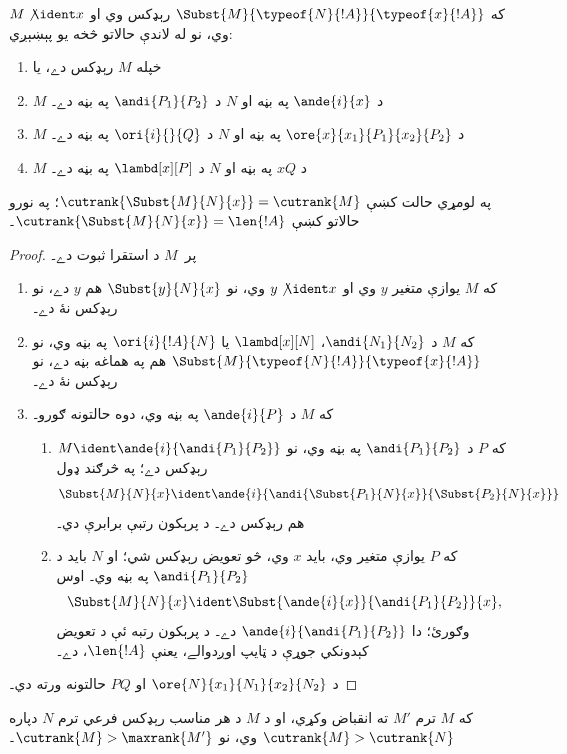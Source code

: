 \documentclass[../../../include/open-logic-section]{subfiles}
\begin{document}
\begin{lem}
  که $\Subst{M}{\typeof{N}{!A}}{\typeof{x}{!A}}$ رېډکس وي او
  $M \not\ident x$ وي، نو له لاندې حالاتو څخه يو پېښېږي:
  \begin{enumerate}
  \item خپله $M$ رېډکس دے، يا
  \item $M$ د $\ande{i}{x}$ په بڼه او $N$ د
    $\andi{P_1}{P_2}$ په بڼه دے۔
  \item $M$ د $\ore{x}{x_1}{P_1}{x_2}{P_2}$ په بڼه او $N$
    د $\ori{i}{}{Q}$ په بڼه دے۔
  \item $M$ د $x Q$ په بڼه او $N$ د
    $\lambd[x][P]$ په بڼه دے۔
  \end{enumerate}
  په لومړي حالت کښې $\cutrank{\Subst{M}{N}{x}} = \cutrank{M}$؛
  په نورو حالاتو کښې $\cutrank{\Subst{M}{N}{x}} = \len{!A}$۔
\end{lem}
\begin{proof}
  پر~$M$ د استقرا ثبوت دے۔
  \begin{enumerate}
  \item که $M$ يوازې متغير $y$ وي او $y \not\ident x$ وي، نو
    $\Subst{y}{N}{x}$ هم $y$ دے، نو رېډکس نۀ دے۔
  \item که $M$ د $\andi{N_1}{N_2}$، $\lambd[x][N]$ يا
    $\ori{i}{!A}{N}$ په بڼه وي، نو
    $\Subst{M}{\typeof{N}{!A}}{\typeof{x}{!A}}$ هم په هماغه
    بڼه دے، نو رېډکس نۀ دے۔
  \item که $M$ د $\ande{i}{P}$ په بڼه وي، دوه حالتونه ګورو۔
    \begin{enumerate}
      \item که $P$ د $\andi{P_1}{P_2}$ په بڼه وي، نو
        $M \ident \ande{i}{\andi{P_1}{P_2}}$ رېډکس دے؛ په
        څرګند ډول
        \[
        \Subst{M}{N}{x} \ident
        \ande{i}{\andi{\Subst{P_1}{N}{x}}{\Subst{P_2}{N}{x}}}
        \]
        هم رېډکس دے۔ د پرېکون رتبې برابرې دي۔
      \item که $P$ يوازې متغير وي، بايد $x$ وي، څو تعويض
        رېډکس شي؛ او $N$ بايد د $\andi{P_1}{P_2}$ په بڼه وي۔
        اوس
        \[
        \Subst{M}{N}{x} \ident \Subst{\ande{i}{x}}{\andi{P_1}{P_2}}{x},
        \]
        وګورئ؛ دا $\ande{i}{\andi{P_1}{P_2}}$ دے۔ د پرېکون
        رتبه ئې د تعويض کېدونکي جوړې د ټايپ اوږدوالے، يعنې
        $\len{!A}$، دے۔
    \end{enumerate}
  \end{enumerate}
  د $\ore{N}{x_1}{N_1}{x_2}{N_2}$ او $P Q$ حالتونه ورته دي۔
\end{proof}

\begin{lem}
  که $M$ ترم $M'$ ته انقباض وکړي، او د $M$ د هر مناسب
  رېډکس فرعي ترم $N$ دپاره $\cutrank{M} > \cutrank{N}$ وي،
  نو $\cutrank{M} > \maxrank{M'}$۔
\end{lem}
\end{document}
